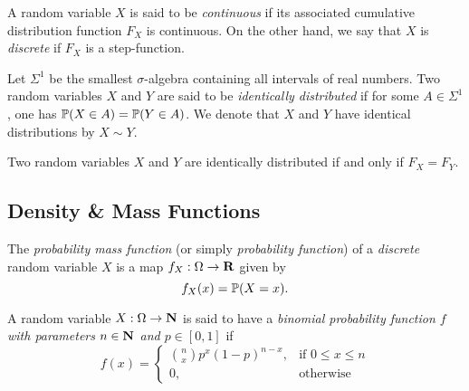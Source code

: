 \begin{definition}
    \label{def:continuity-discreteness-random-variable}
    A random variable \(X\) is said to be \emph{continuous} if its associated
    cumulative distribution function \(F_X\) is continuous. On the other hand, we
    say that \(X\) is \emph{discrete} if \(F_X\) is a step-function.
\end{definition}

\begin{definition}
    \label{def:identically-distributed-random-variables}
    Let \(\Sigma^1\) be the smallest \(\sigma\)-algebra containing all intervals of
    real numbers. Two random variables \(X\) and \(Y\) are said to be
    \emph{identically distributed} if for some \(A \in \Sigma^1\), one has
    \(\operatorname{\mathbb{P}}(X \in A) = \operatorname{\mathbb{P}}(Y \in A)\). We denote that \(X\) and \(Y\) have
    identical distributions by \(X \sim Y\).
\end{definition}

\begin{theorem}
    \label{thm:random-variables-identical-iff-equal-cdfs}
    Two random variables \(X\) and \(Y\) are identically distributed if and only if
    \(F_X = F_Y\).
\end{theorem}

\subsection{Density \& Mass Functions}

\begin{definition}
    \label{def:probability-mass-function}
    The \emph{probability mass function} (or simply \emph{probability function})
    of a \emph{discrete} random variable \(X\) is a map \(f_X: \Omega \to \mathbf{R}\) given
    by
    \[
        f_X(x) = \operatorname{\mathbb{P}}(X = x).
    \]
\end{definition}

\begin{definition}
    \label{def:binomial-distribution}
    A random variable \(X: \Omega \to \mathbf{N}\) is said to have a
    \emph{binomial probability function \(f\) with parameters \(n \in \mathbf{N}\) and
        \(p \in [0, 1]\)} if
    \[
        f(x) =
        \begin{cases}
            \binom{n}{x} p^x (1 - p)^{n - x}, & \text{if } 0 \leq x \leq n \\
            0,                                & \text{otherwise}
        \end{cases}
    \]
\end{definition}

